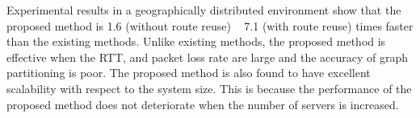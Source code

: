 Experimental results in a geographically distributed environment show that the proposed method is 1.6 (without route reuse) ~ 7.1 (with route reuse) times faster than the existing methods. Unlike existing methods, the proposed method is effective when the RTT, and packet loss rate are large and the accuracy of graph partitioning is poor. The proposed method is also found to have excellent scalability with respect to the system size. This is because the performance of the proposed method does not deteriorate when the number of servers is increased.

\vspace{36pt}
\thispagestyle{empty}
\clearpage